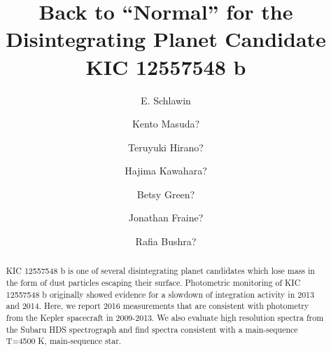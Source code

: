 \documentclass[preprint]{aastex61}
\begin{document}
\title{Back to ``Normal'' for the Disintegrating Planet Candidate KIC 12557548 b}



\author{E. Schlawin}

\author{Kento Masuda?}

\author{Teruyuki Hirano?}

\author{Hajima Kawahara?}

\author{Betsy Green?}

\author{Jonathan Fraine?}

\author{Rafia Bushra?}

\begin{abstract}
KIC 12557548 b is one of several disintegrating planet candidates which lose mass in the form of dust particles escaping their surface.
Photometric monitoring of KIC 12557548 b originally showed evidence for a slowdown of integration activity in 2013 and 2014.
Here, we report 2016 measurements that are consistent with photometry from the Kepler spacecraft in 2009-2013.
We also evaluate high resolution spectra from the Subaru HDS spectrograph and find spectra consistent with a main-sequence T=4500 K, main-sequence star.	
\end{abstract}



\end{document}
